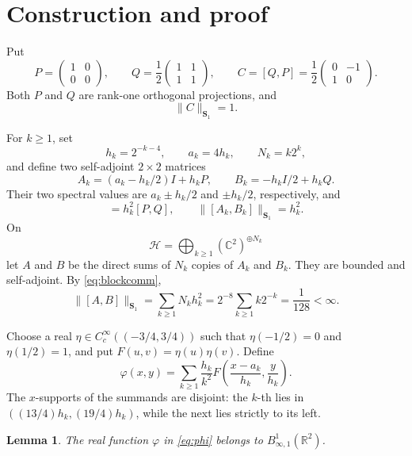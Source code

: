 \documentclass[11pt]{article}
\newtheorem{lemma}{Lemma}
\newcommand{\R}{\mathbb R}
\newcommand{\Sone}{\boldsymbol S_1}
\begin{document}
\section{Construction and proof}

Put
\[
 P=\begin{pmatrix}1&0\\0&0\end{pmatrix},\qquad
 Q=\frac12\begin{pmatrix}1&1\\1&1\end{pmatrix},\qquad
 C=[Q,P]=\frac12\begin{pmatrix}0&-1\\1&0\end{pmatrix}.
\]
Both $P$ and $Q$ are rank-one orthogonal projections, and
\begin{equation}
 \|C\|_{\Sone}=1. \label{eq:C}
\end{equation}

For $k\geq1$, set
\[
 h_k=2^{-k-4},\qquad a_k=4h_k,\qquad N_k=k2^k,
\]
and define two self-adjoint $2\times2$ matrices
\[
 A_k=(a_k-h_k/2)I+h_kP,\qquad B_k=-h_kI/2+h_kQ.
\]
Their two spectral values are $a_k\pm h_k/2$ and $\pm h_k/2$, respectively,
and
\begin{equation}
 [A_k,B_k]=h_k^2[P,Q],\qquad
 \|[A_k,B_k]\|_{\Sone}=h_k^2. \label{eq:blockcomm}
\end{equation}
On
\[
 \mathcal H=\bigoplus_{k\geq1}(\mathbb C^2)^{\oplus N_k}
\]
let $A$ and $B$ be the direct sums of $N_k$ copies of $A_k$ and $B_k$.
They are bounded and self-adjoint.  By \eqref{eq:blockcomm},
\begin{equation}
 \|[A,B]\|_{\Sone}
 =\sum_{k\geq1}N_kh_k^2
 =2^{-8}\sum_{k\geq1}k2^{-k}
 =\frac1{128}<\infty. \label{eq:globalcomm}
\end{equation}

Choose a real $\eta\in C_c^\infty((-3/4,3/4))$ such that
$\eta(-1/2)=0$ and $\eta(1/2)=1$, and put $F(u,v)=\eta(u)\eta(v)$.  Define
\begin{equation}
 \varphi(x,y)=\sum_{k\geq1}\frac{h_k}{k^2}
 F\left(\frac{x-a_k}{h_k},\frac{y}{h_k}\right). \label{eq:phi}
\end{equation}
The $x$-supports of the summands are disjoint: the $k$-th lies in
$((13/4)h_k,(19/4)h_k)$, while the next lies strictly to its left.

\begin{lemma}
The real function $\varphi$ in \eqref{eq:phi} belongs to $B^1_{\infty,1}(\R^2)$.
\end{lemma}
\end{document}
